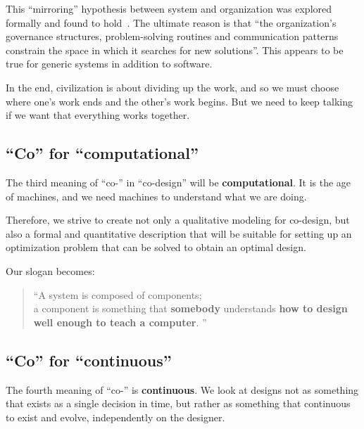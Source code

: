 This ``mirroring'' hypothesis between system and organization was explored formally and found to hold~\cite{maccormack12exploring}.
The ultimate reason is that ``the organization's governance structures, problem-solving routines and communication patterns constrain the space in which it searches for new solutions''.
This appears to be true for generic systems in addition to software.

In the end, civilization is about dividing up the work, and so we must choose where one's work ends and the other's work begins.
But we need to keep talking if we want that everything works together.

\subsection{``Co'' for ``computational''}

The third meaning of ``co-'' in ``co-design'' will be \textbf{computational}.
It is the age of machines, and we need machines to understand what we are doing.

Therefore, we strive to create not only a qualitative modeling for co-design, but also a formal and quantitative description that will be suitable for setting up an optimization problem that can be solved to obtain an optimal design.

Our slogan becomes:

\begin{quote}
    \enquote{A system is composed of components;\\
        a component is something that \textbf{somebody} understands
        \textbf{how to design} \textbf{well enough to teach a computer}.
    }
\end{quote}

\subsection{``Co'' for ``continuous''}

The fourth meaning of ``co-'' is \textbf{continuous}.
We look at designs not as something that exists as a single decision in time, but rather as something that continuous to exist and evolve, independently on the designer.


